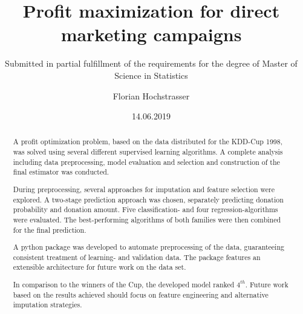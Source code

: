 \begin{titlepage}

\titlehead{Master Thesis}
\title{Profit maximization for direct marketing campaigns}
\subject{An application of data-driven decision making}
\subtitle{Submitted in partial fulfillment of the requirements for the degree of Master of Science in Statistics}
\author{Florian Hochstrasser}
\date{14.06.2019}
\publishers{Supervisor: Jacques Zuber}

\end{titlepage}

\let\maketitle\oldmaketitle
\maketitle

\begin{abstract}
A profit optimization problem, based on the data distributed for the KDD-Cup 1998, was solved using several different supervised learning algorithms. A complete analysis including data preprocessing, model evaluation and selection and construction of the final estimator was conducted.

During preprocessing, several approaches for imputation and feature selection were explored. A two-stage prediction approach was chosen, separately predicting donation probability and donation amount. Five classification- and four regression-algorithms were evaluated. The best-performing algorithms of both families were then combined for the final prediction.

A python package was developed to automate preprocessing of the data, guaranteeing consistent treatment of learning- and validation data. The package features an extensible architecture for future work on the data set.

In comparison to the winners of the Cup, the developed model ranked $4^{th}$. Future work based on the results achieved should focus on feature engineering and alternative imputation strategies.
\end{abstract}
